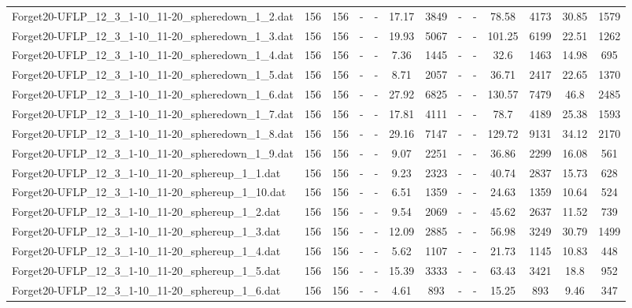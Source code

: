 \begin{table}[!ht]
{\begin{tabular}{lcccccccccccc}
Forget20-UFLP\_12\_3\_1-10\_11-20\_spheredown\_1\_2.dat & 156 & 156 &  - &  - & 17.17 & 3849 &  - &  - & 78.58 & 4173 & 30.85 & 1579 \\
Forget20-UFLP\_12\_3\_1-10\_11-20\_spheredown\_1\_3.dat & 156 & 156 &  - &  - & 19.93 & 5067 &  - &  - & 101.25 & 6199 & 22.51 & 1262 \\
Forget20-UFLP\_12\_3\_1-10\_11-20\_spheredown\_1\_4.dat & 156 & 156 &  - &  - & 7.36 & 1445 &  - &  - & 32.6 & 1463 & 14.98 & 695 \\
Forget20-UFLP\_12\_3\_1-10\_11-20\_spheredown\_1\_5.dat & 156 & 156 &  - &  - & 8.71 & 2057 &  - &  - & 36.71 & 2417 & 22.65 & 1370 \\
Forget20-UFLP\_12\_3\_1-10\_11-20\_spheredown\_1\_6.dat & 156 & 156 &  - &  - & 27.92 & 6825 &  - &  - & 130.57 & 7479 & 46.8 & 2485 \\
Forget20-UFLP\_12\_3\_1-10\_11-20\_spheredown\_1\_7.dat & 156 & 156 &  - &  - & 17.81 & 4111 &  - &  - & 78.7 & 4189 & 25.38 & 1593 \\
Forget20-UFLP\_12\_3\_1-10\_11-20\_spheredown\_1\_8.dat & 156 & 156 &  - &  - & 29.16 & 7147 &  - &  - & 129.72 & 9131 & 34.12 & 2170 \\
Forget20-UFLP\_12\_3\_1-10\_11-20\_spheredown\_1\_9.dat & 156 & 156 &  - &  - & 9.07 & 2251 &  - &  - & 36.86 & 2299 & 16.08 & 561 \\
Forget20-UFLP\_12\_3\_1-10\_11-20\_sphereup\_1\_1.dat & 156 & 156 &  - &  - & 9.23 & 2323 &  - &  - & 40.74 & 2837 & 15.73 & 628 \\
Forget20-UFLP\_12\_3\_1-10\_11-20\_sphereup\_1\_10.dat & 156 & 156 &  - &  - & 6.51 & 1359 &  - &  - & 24.63 & 1359 & 10.64 & 524 \\
Forget20-UFLP\_12\_3\_1-10\_11-20\_sphereup\_1\_2.dat & 156 & 156 &  - &  - & 9.54 & 2069 &  - &  - & 45.62 & 2637 & 11.52 & 739 \\
Forget20-UFLP\_12\_3\_1-10\_11-20\_sphereup\_1\_3.dat & 156 & 156 &  - &  - & 12.09 & 2885 &  - &  - & 56.98 & 3249 & 30.79 & 1499 \\
Forget20-UFLP\_12\_3\_1-10\_11-20\_sphereup\_1\_4.dat & 156 & 156 &  - &  - & 5.62 & 1107 &  - &  - & 21.73 & 1145 & 10.83 & 448 \\
Forget20-UFLP\_12\_3\_1-10\_11-20\_sphereup\_1\_5.dat & 156 & 156 &  - &  - & 15.39 & 3333 &  - &  - & 63.43 & 3421 & 18.8 & 952 \\
Forget20-UFLP\_12\_3\_1-10\_11-20\_sphereup\_1\_6.dat & 156 & 156 &  - &  - & 4.61 & 893 &  - &  - & 15.25 & 893 & 9.46 & 347 \\

\end{tabular}}
\end{table}

